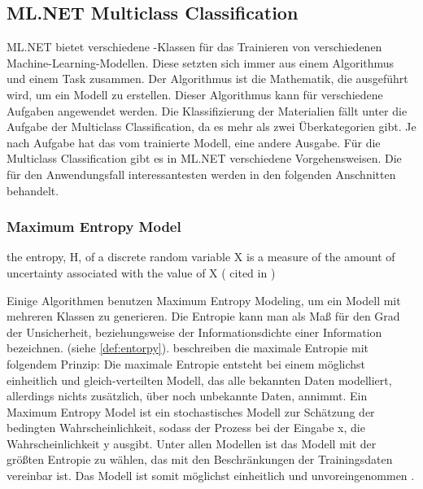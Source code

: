 \subsection{ML.NET Multiclass Classification}
\label{c:conception:classification:multiclass}
ML.NET bietet verschiedene -Klassen für das Trainieren von verschiedenen Machine-Learning-Modellen. Diese setzten sich immer aus einem Algorithmus und einem \glqq Task\grqq{} zusammen. Der Algorithmus ist die Mathematik, die ausgeführt wird, um ein Modell zu erstellen. Dieser Algorithmus kann für verschiedene Aufgaben angewendet werden. Die Klassifizierung der Materialien fällt unter die Aufgabe der Multiclass Classification, da es mehr als zwei Überkategorien gibt. Je nach Aufgabe hat das vom  trainierte Modell, eine andere Ausgabe. \citep[vgl.][]{select_ml_2021}
Für die Multiclass Classification gibt es in ML.NET verschiedene Vorgehensweisen. Die für den Anwendungsfall interessantesten werden in den folgenden Anschnitten behandelt.

\subsubsection{Maximum Entropy Model}
\begin{definition}[Entropie]
	\label{def:entorpy}
	\glqq the entropy, H, of a discrete random variable X is a measure of the amount of uncertainty associated with the value of X \grqq{} (\cite{shannon1948} cited in \cite{sep-information})
\end{definition}

\label{c:conception:classification:multiclass:maximum-entropy}
Einige Algorithmen benutzen Maximum Entropy Modeling, um ein Modell mit mehreren Klassen zu generieren. Die Entropie kann man als Maß für den Grad der Unsicherheit, beziehungsweise der Informationsdichte einer Information bezeichnen. (siehe \autoref{def:entorpy}). \cite{maximumentorpy1996} beschreiben die maximale Entropie mit folgendem Prinzip: Die maximale Entropie entsteht bei einem möglichst einheitlich und gleich-verteilten Modell, das alle bekannten Daten modelliert, allerdings nichts zusätzlich, über noch unbekannte Daten, annimmt. Ein Maximum Entropy Model ist ein stochastisches Modell zur Schätzung der bedingten Wahrscheinlichkeit, sodass der Prozess bei der Eingabe x, die Wahrscheinlichkeit y ausgibt. Unter allen Modellen ist das Modell mit der größten Entropie zu wählen, das mit den Beschränkungen der Trainingsdaten vereinbar ist. Das Modell ist somit möglichst einheitlich und unvoreingenommen \citep[vgl.][]{maximumentorpy1996}.

